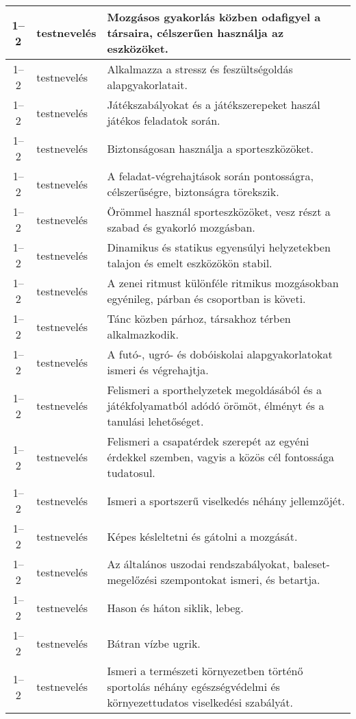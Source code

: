 \begin{small}
\begin{longtable}{c | p{2cm} |  p{11cm} }
              1--2 & testnevelés & Mozgásos gyakorlás közben odafigyel a társaira, célszerűen használja az eszközöket. \\ \hline
              1--2 & testnevelés & Alkalmazza a stressz és feszültségoldás alapgyakorlatait. \\ \hline
              1--2 & testnevelés & Játékszabályokat és a játékszerepeket haszál játékos feladatok során. \\ \hline
              1--2 & testnevelés & Biztonságosan használja a sporteszközöket. \\ \hline
              1--2 & testnevelés & A feladat-végrehajtások során pontosságra, célszerűségre, biztonságra törekszik. \\ \hline
              1--2 & testnevelés & Örömmel használ sporteszközöket, vesz részt a szabad és gyakorló mozgásban. \\ \hline
              1--2 & testnevelés & Dinamikus és statikus egyensúlyi helyzetekben talajon és emelt eszközökön stabil. \\ \hline
              1--2 & testnevelés & A zenei ritmust különféle ritmikus mozgásokban egyénileg, párban és csoportban is követi. \\ \hline
              1--2 & testnevelés & Tánc közben párhoz, társakhoz térben alkalmazkodik. \\ \hline
              1--2 & testnevelés & A futó-, ugró- és dobóiskolai alapgyakorlatokat ismeri és végrehajtja. \\ \hline
              1--2 & testnevelés & Felismeri a sporthelyzetek megoldásából és a játékfolyamatból adódó örömöt, élményt és a tanulási lehetőséget. \\ \hline
              1--2 & testnevelés & Felismeri a csapatérdek szerepét az egyéni érdekkel szemben, vagyis a közös cél fontossága tudatosul. \\ \hline
              1--2 & testnevelés & Ismeri a sportszerű viselkedés néhány jellemzőjét. \\ \hline
              1--2 & testnevelés & Képes késleltetni és gátolni a mozgását. \\ \hline
              1--2 & testnevelés & Az általános uszodai rendszabályokat, baleset-megelőzési szempontokat ismeri, és betartja. \\ \hline
              1--2 & testnevelés & Hason és háton siklik, lebeg. \\ \hline
              1--2 & testnevelés & Bátran vízbe ugrik. \\ \hline
              1--2 & testnevelés & Ismeri a természeti környezetben történő sportolás néhány egészségvédelmi és környezettudatos viselkedési szabályát. \\ \hline

\end{longtable}
\end{small}
